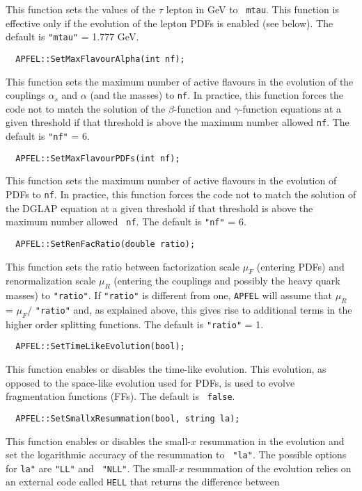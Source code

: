 \documentclass[11pt,a4paper]{article}
\begin{document}
This function sets the values of the $\tau$ lepton in GeV to {\tt
  mtau}. This function is effective only if the evolution of the
lepton PDFs is enabled (see below). The default is {\tt "mtau"} =
1.777 GeV.
\begin{lstlisting}
  APFEL::SetMaxFlavourAlpha(int nf);
\end{lstlisting}
This function sets the maximum number of active flavours in the
evolution of the couplings $\alpha_s$ and $\alpha$ (and the masses) to
{\tt nf}. In practice, this function forces the code not to match the
solution of the $\beta$-function and $\gamma$-function equations at a
given threshold if that threshold is above the maximum number allowed
{\tt nf}. The default is {\tt "nf"} = 6.
\begin{lstlisting}
  APFEL::SetMaxFlavourPDFs(int nf);
\end{lstlisting}
This function sets the maximum number of active flavours in the
evolution of PDFs to {\tt nf}. In practice, this function forces the
code not to match the solution of the DGLAP equation at a given
threshold if that threshold is above the maximum number allowed {\tt
  nf}. The default is {\tt "nf"} = 6.
\begin{lstlisting}
  APFEL::SetRenFacRatio(double ratio);
\end{lstlisting}
This function sets the ratio between factorization scale $\mu_F$
(entering PDFs) and renormalization scale $\mu_R$ (entering the
couplings and possibly the heavy quark masses) to {\tt "ratio"}. If
{\tt "ratio"} is different from one, {\tt APFEL} will assume that
$\mu_R$ = $\mu_F /$ {\tt "ratio"} and, as explained above, this gives
rise to additional terms in the higher order splitting functions. The
default is {\tt "ratio"} = 1.
\begin{lstlisting}
  APFEL::SetTimeLikeEvolution(bool);
\end{lstlisting}
This function enables or disables the time-like evolution. This
evolution, as opposed to the space-like evolution used for PDFs, is
used to evolve fragmentation functions (FFs). The default is {\tt
  false}.
\begin{lstlisting}
  APFEL::SetSmallxResummation(bool, string la);
\end{lstlisting}
This function enables or disables the small-$x$ resummation in the
evolution and set the logarithmic accuracy of the resummation to {\tt
  "la"}. The possible options for {\tt la"} are {\tt "LL"} and {\tt
  "NLL"}. The small-$x$ resummation of the evolution relies on an
  external code called {\tt HELL} that returns the difference between
\end{document}
